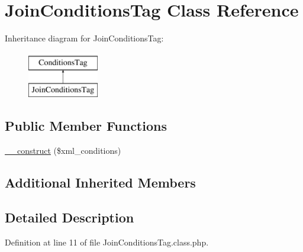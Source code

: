 \hypertarget{classJoinConditionsTag}{\section{Join\-Conditions\-Tag Class Reference}
\label{classJoinConditionsTag}
}
Inheritance diagram for Join\-Conditions\-Tag\-:\begin{figure}[H]
\begin{center}
\leavevmode
\includegraphics[height=2.000000cm]{classJoinConditionsTag}
\end{center}
\end{figure}
\subsection*{Public Member Functions}
\begin{DoxyCompactItemize}
\item 
\hyperlink{classJoinConditionsTag_aa5baf09ffdba2383219b0351cdbf0ca4}{\-\_\-\-\_\-construct} (\$xml\-\_\-conditions)
\end{DoxyCompactItemize}
\subsection*{Additional Inherited Members}


\subsection{Detailed Description}


Definition at line 11 of file Join\-Conditions\-Tag.\-class.\-php.



